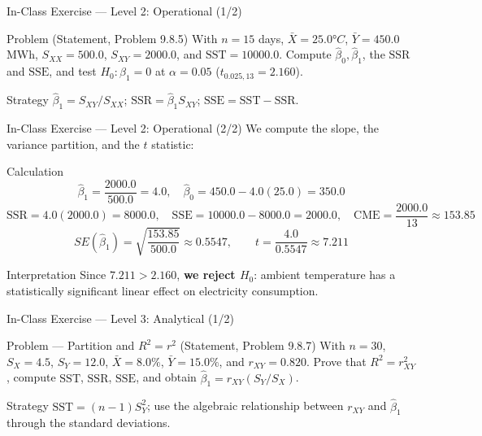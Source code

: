 \documentclass[10pt, aspectratio=169]{beamer}
\begin{document}
\begin{frame}{In-Class Exercise --- Level 2: Operational (1/2)}
  \footnotesize
  \begin{block}{Problem (Statement, Problem 9.8.5)}
    With $n=15$ days, $\bar X=25.0°C$, $\bar Y=450.0$ MWh, $S_{XX}=500.0$, $S_{XY}=2000.0$, and $\text{SST}=10000.0$. Compute $\hat\beta_0,\hat\beta_1$, the $\text{SSR}$ and $\text{SSE}$, and test $H_0:\beta_1=0$ at $\alpha=0.05$ ($t_{0.025,13}=2.160$).
  \end{block}

  \vspace{0.15cm}
  \pause
  \begin{alertblock}{Strategy}
    \scriptsize
    $\hat\beta_1=S_{XY}/S_{XX}$; $\text{SSR}=\hat\beta_1 S_{XY}$; $\text{SSE}=\text{SST}-\text{SSR}$.
  \end{alertblock}
\end{frame}

\begin{frame}{In-Class Exercise --- Level 2: Operational (2/2)}
  \scriptsize
  We compute the slope, the variance partition, and the $t$ statistic: \pause

  \vspace{0.05cm}
  \begin{block}{Calculation}
    $$\hat\beta_1=\frac{2000.0}{500.0}=4.0, \quad \hat\beta_0=450.0-4.0(25.0)=350.0$$
    $$\text{SSR}=4.0(2000.0)=8000.0, \quad \text{SSE}=10000.0-8000.0=2000.0, \quad \text{CME}=\frac{2000.0}{13}\approx153.85$$
    $$SE(\hat\beta_1)=\sqrt{\frac{153.85}{500.0}}\approx0.5547, \qquad t=\frac{4.0}{0.5547}\approx7.211$$
  \end{block}

  \vspace{0.05cm}
  \pause
  \begin{alertblock}{Interpretation}
    \scriptsize
    Since $7.211>2.160$, \textbf{we reject $H_0$}: ambient temperature has a statistically significant linear effect on electricity consumption.
  \end{alertblock}
\end{frame}

\begin{frame}{In-Class Exercise --- Level 3: Analytical (1/2)}
  \footnotesize
  \begin{block}{Problem --- Partition and $R^2=r^2$ (Statement, Problem 9.8.7)}
    With $n=30$, $S_X=4.5$, $S_Y=12.0$, $\bar X=8.0\%$, $\bar Y=15.0\%$, and $r_{XY}=0.820$. Prove that $R^2=r_{XY}^2$, compute $\text{SST}$, $\text{SSR}$, $\text{SSE}$, and obtain $\hat\beta_1=r_{XY}(S_Y/S_X)$.
  \end{block}

  \vspace{0.1cm}
  \pause
  \begin{alertblock}{Strategy}
    \scriptsize
    $\text{SST}=(n-1)S_Y^2$; use the algebraic relationship between $r_{XY}$ and $\hat\beta_1$ through the standard deviations.
  \end{alertblock}
\end{frame}
\end{document}
